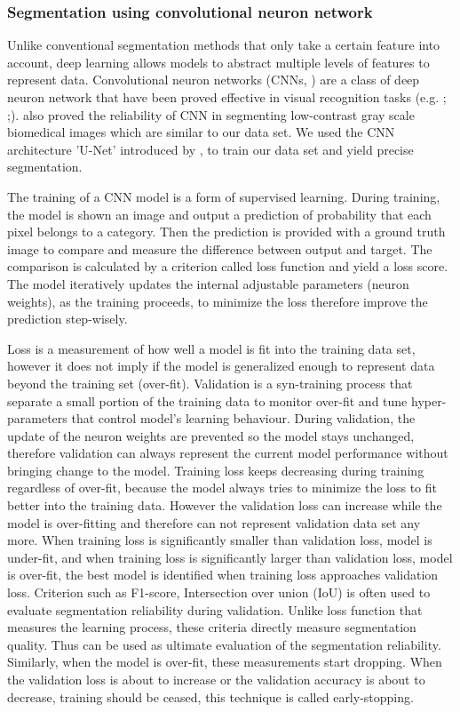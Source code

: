 \documentclass[draft,linenumbers]{agujournal2018}
\begin{document}
\subsubsection{Segmentation using convolutional neuron network}
Unlike conventional segmentation methods that only take a certain feature into account, deep learning allows models to abstract multiple levels of features to represent data. Convolutional neuron networks (CNNs, \citet{lecun1989backpropagation}) are a class of deep neuron network that have been proved effective in visual recognition tasks (e.g. \citet{krizhevsky2012imagenet}; \citet{long2015fully};\citet{girshick2014rich}). \citet{ronneberger2015u} also proved the reliability of CNN in segmenting low-contrast gray scale biomedical images which are similar to our data set. We used the CNN architecture 'U-Net' introduced by \citet{ronneberger2015u}, to train our data set and yield precise segmentation.


The training of a CNN model is a form of supervised learning. During training, the model is shown an image and output a prediction of probability that each pixel belongs to a category. Then the prediction is provided with a ground truth image to compare and measure the difference between output and target. The comparison is calculated by a criterion called loss function and yield a loss score. The model iteratively updates the internal adjustable parameters (neuron weights), as the training proceeds, to minimize the loss therefore improve the prediction step-wisely.


Loss is a measurement of how well a model is fit into the training data set, however it does not imply if the model is generalized enough to represent data beyond the training set (over-fit). Validation is a syn-training process that separate a small portion of the training data to monitor over-fit and tune hyper-parameters that control model's learning behaviour. During validation, the update of the neuron weights are prevented so the model stays unchanged, therefore validation can always represent the current model performance without bringing change to the model. Training loss keeps decreasing during training regardless of over-fit, because the model always tries to minimize the loss to fit better into the training data. However the validation loss can increase while the model is over-fitting and therefore can not represent validation data set any more. When training loss is significantly smaller than validation loss, model is under-fit, and when training loss is significantly larger than validation loss, model is over-fit, the best model is identified when training loss approaches validation loss. Criterion such as F1-score, Intersection over union (IoU) is often used to evaluate segmentation reliability during validation. Unlike loss function that measures the learning process, these criteria directly measure segmentation quality. Thus can be used as ultimate evaluation of the segmentation reliability. Similarly, when the model is over-fit, these measurements start dropping. When the validation loss is about to increase or the validation accuracy is about to decrease, training should be ceased, this technique is called early-stopping. 
\end{document}

